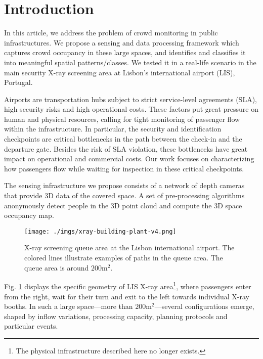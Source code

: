 
\section{Introduction}
\label{sec:intro}
%
In this article, we address the problem of crowd monitoring in public infrastructures. We propose a sensing and data processing framework which captures crowd occupancy in these large spaces, and identifies and classifies it into meaningful spatial patterns/classes. 
We tested it in a real-life scenario in the main security X-ray screening area at Lisbon's international airport (LIS), Portugal.

Airports are transportation hubs subject to strict service-level agreements (SLA), high security risks and high operational costs. These factors put great pressure on human and physical resources, calling for tight monitoring of passenger flow within the infrastructure.
In particular, the security and identification checkpoints are critical bottlenecks in the path between the check-in and the departure gate. Besides the risk of SLA violation, these bottlenecks have great impact on operational and commercial costs. 
Our work focuses on characterizing how passengers flow while waiting for inspection in these critical checkpoints. 

The sensing infrastructure we propose consists of a network of depth cameras that provide 3D data of the covered space. A set of pre-processing algorithms anonymously detect people in the 3D point cloud and compute the 3D space occupancy map.
%
\begin{figure}[t]
\centering
\texttt{[image: ./imgs/xray-building-plant-v4.png]}
\caption{X-ray screening queue area at the Lisbon international airport. The colored lines illustrate examples of paths in the queue area. The queue area is around $200\text{m}^2$.}
\label{fig:queue-modes}
\end{figure}
%
Fig. \ref{fig:queue-modes} displays the specific geometry of LIS X-ray area\footnote{The physical infrastructure described here no longer exists.}, where passengers enter from the right, wait for their turn and exit to the left towards individual X-ray booths. In such a large space---more than $200\text{m}^2$---several configurations emerge, shaped by inflow variations, processing capacity, planning protocols and particular events. 

